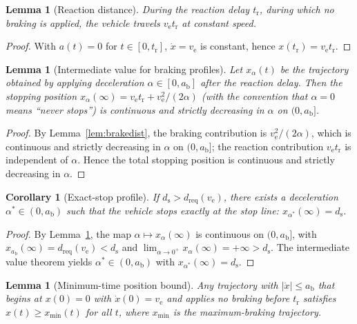 \documentclass[conference, a4paper]{IEEEtran}
\theoremstyle{plain}
\newtheorem{lemma}[theorem]{Lemma}
\newtheorem{corollary}[theorem]{Corollary}
\newcommand{\dreq}{d_{\mathrm{req}}}
\newcommand{\ds}{d_{\mathrm{s}}}
\newcommand{\ab}{a_{\mathrm{b}}}
\newcommand{\tr}{t_{\mathrm{r}}}
\newcommand{\ve}{v_{\mathrm{e}}}
\begin{document}
\begin{lemma}[Reaction distance]
\label{lem:reactdist}
During the reaction delay $\tr$, during which no braking is applied, the
vehicle travels $\ve \tr$ at constant speed.
\end{lemma}

\begin{proof}
With $a(t) = 0$ for $t \in [0, \tr]$, $\dot{x} = \ve$ is constant, hence
$x(\tr) = \ve \tr$.
\end{proof}

\begin{lemma}[Intermediate value for braking profiles]
\label{lem:ivt}
Let $x_\alpha(t)$ be the trajectory obtained by applying deceleration
$\alpha \in [0, \ab]$ after the reaction delay. Then the stopping position
$x_\alpha(\infty) = \ve \tr + \ve^2/(2\alpha)$ (with the convention that
$\alpha = 0$ means ``never stops'') is continuous and strictly decreasing in
$\alpha$ on $(0, \ab]$.
\end{lemma}

\begin{proof}
By Lemma~\ref{lem:brakedist}, the braking contribution is $\ve^2/(2\alpha)$,
which is continuous and strictly decreasing in $\alpha$ on $(0, \ab]$;
the reaction contribution $\ve \tr$ is independent of $\alpha$. Hence the
total stopping position is continuous and strictly decreasing in $\alpha$.
\end{proof}

\begin{corollary}[Exact-stop profile]
\label{cor:exactstop}
If $\ds > \dreq(\ve)$, there exists a deceleration $\alpha^* \in (0,\ab)$
such that the vehicle stops exactly at the stop line:
$x_{\alpha^*}(\infty) = \ds$.
\end{corollary}

\begin{proof}
By Lemma~\ref{lem:ivt}, the map $\alpha \mapsto x_\alpha(\infty)$ is
continuous on $(0,\ab]$, with $x_{\ab}(\infty) = \dreq(\ve) < \ds$ and
$\lim_{\alpha \to 0^+} x_\alpha(\infty) = +\infty > \ds$. The intermediate
value theorem yields $\alpha^* \in (0, \ab)$ with
$x_{\alpha^*}(\infty) = \ds$.
\end{proof}

\begin{lemma}[Minimum-time position bound]
\label{lem:minpos}
Any trajectory with $|\ddot{x}| \leq \ab$ that begins at $x(0)=0$ with
$\dot{x}(0) = \ve$ and applies no braking before $\tr$ satisfies
$x(t) \geq x_{\min}(t)$ for all $t$, where $x_{\min}$ is the
maximum-braking trajectory.
\end{lemma}
\end{document}
